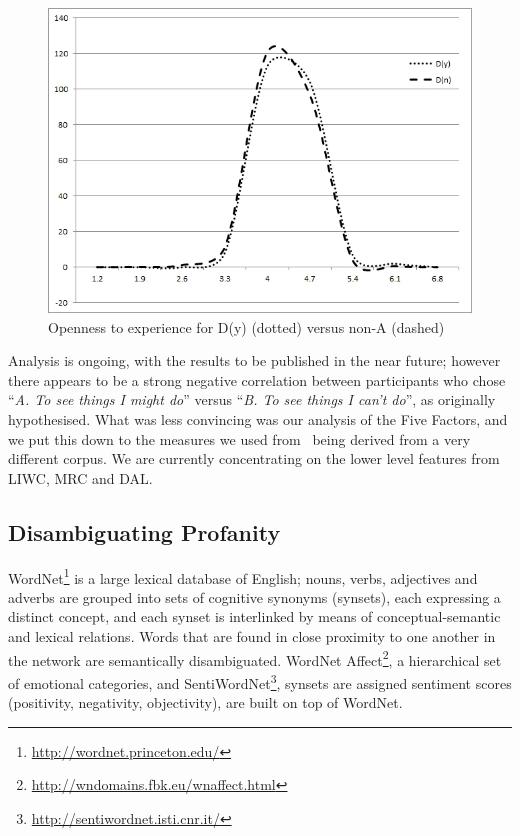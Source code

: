 \documentclass{AISB2008}
\begin{document}
\begin{figure}[!ht]
\centering
\includegraphics[width=\columnwidth]{images/openD.jpg}
\caption{Openness to experience for D(y) (dotted) versus non-A (dashed)}
\label{fig:openD}
\end{figure}

Analysis is ongoing, with the results to be published in the near
future; however there appears to be a strong negative correlation
between participants who chose ``{\emph{A. To see things I might
do}}'' versus ``{\emph{B. To see things I can't do}}'', as originally
hypothesised. What was less convincing was our analysis of the Five
Factors, and we put this down to the measures we used
from~\cite{mairesse-et-al:2007} being derived from a very different
corpus. We are currently concentrating on the lower level features
from LIWC, MRC and DAL.


\subsection{Disambiguating Profanity}

WordNet\footnote{\url{http://wordnet.princeton.edu/}} is a large
lexical database of English; nouns, verbs, adjectives and adverbs are
grouped into sets of cognitive synonyms (synsets), each expressing a
distinct concept, and each synset is interlinked by means of
conceptual-semantic and lexical relations. Words that are found in
close proximity to one another in the network are semantically
disambiguated. WordNet
Affect\footnote{\url{http://wndomains.fbk.eu/wnaffect.html}}, a
hierarchical set of emotional categories, and
SentiWordNet\footnote{\url{http://sentiwordnet.isti.cnr.it/}}, synsets
are assigned sentiment scores (positivity, negativity, objectivity),
are built on top of WordNet.
\end{document}
